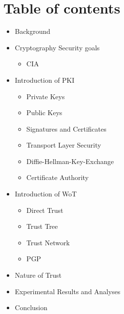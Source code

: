 \section{Table of contents}
\begin{frame}
    \begin{itemize}
        \item<1> Background
        \item<1> Cryptography Security goals
            \begin{itemize}
                \item<1> CIA
            \end{itemize}
        \item<1> Introduction of PKI
            \begin{itemize}
                \item<1> Private Keys
                \item<1> Public Keys
                \item<1> Signatures and Certificates
                \item<1> Transport Layer Security
                \item<1> Diffie-Hellman-Key-Exchange
                \item<1> Certificate Authority
            \end{itemize}
        \item<1> Introduction of WoT
            \begin{itemize}
                \item<1> Direct Trust
                \item<1> Trust Tree
                \item<1> Trust Network
                \item<1> PGP
            \end{itemize}
        \item<1> Nature of Trust
        \item<1> Experimental Results and Analyses
        \item<1> Conclusion
    \end{itemize}
\end{frame}

